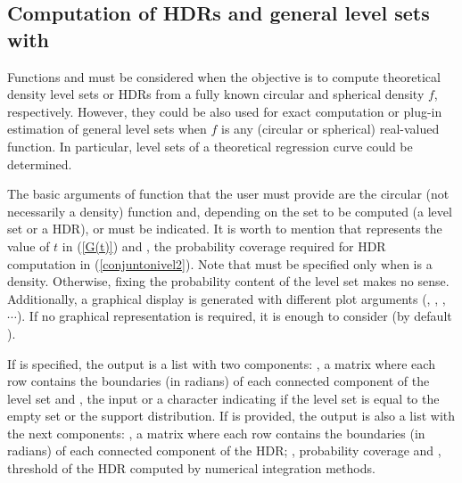 \subsection{Computation of HDRs and general level sets with }

Functions  and  must be considered when the objective is to compute theoretical density level sets or HDRs from a fully known circular and spherical density $f$, respectively. However, they could be also used for exact computation or plug-in estimation of general level sets when $f$ is any (circular or spherical) real-valued function. In particular, level sets of a theoretical regression curve could be determined.


The basic arguments of function  that the user must provide are the circular (not necessarily a density) function  and, depending on the set to be computed (a level set or a HDR),  or  must be indicated. It is worth to mention that  represents the value of $t$ in  (\ref{G(t)}) and , the probability coverage required for HDR computation in (\ref{conjuntonivel2}). Note that  must be specified only when   is a density. Otherwise, fixing the probability content of the level set makes no sense. Additionally, a graphical display is generated with different plot arguments (, , , $\cdots$). If no graphical representation is required, it is enough to consider  (by default ).

If  is specified, the output is a list with two components: , a matrix where each row contains the boundaries (in radians) of each connected component of the level set and , the input  or a character indicating if the level set is equal to the empty set or the support distribution. If  is provided, the output is also a list with the next components: , a matrix where each row contains the boundaries (in radians) of each connected component of the HDR; , probability coverage  and , threshold of the HDR computed by numerical integration methods. 


